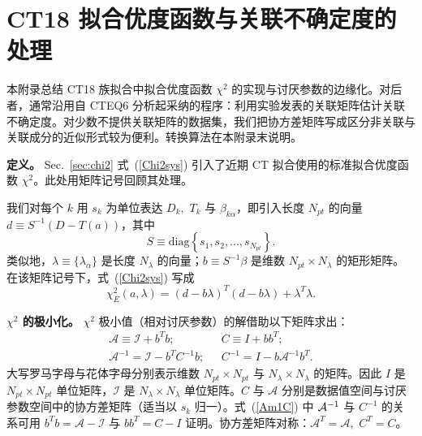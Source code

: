 \clearpage

\section{CT18 拟合优度函数与关联不确定度的处理}
\label{sec:chi2_app}
%
%
\newcommand{\betamat}{b}

本附录总结 CT18 族拟合中拟合优度函数 $\chi^2$ 的实现与讨厌参数的边缘化。对后者，通常沿用自 CTEQ6 分析起采纳的程序：利用实验发表的关联矩阵估计关联不确定度。对少数不提供关联矩阵的数据集，我们把协方差矩阵写成区分非关联与关联成分的近似形式较为便利。转换算法在本附录末说明。


{\bf 定义。}
Sec.~\ref{sec:chi2} 式~(\ref{Chi2sys}) 引入了近期 CT 拟合使用的标准拟合优度函数 $\chi^{2}$。此处用矩阵记号回顾其处理。

我们对每个 $k$ 用 $s_{k}$ 为单位表达 $D_{k},$ $T_{k}$ 与 $\beta_{k\alpha}$，即引入长度 $N_{pt}$ 的向量
$d\equiv S^{-1}\left(D-T(a)\right)$，其中
\begin{equation}
S\equiv\mbox{diag}\left\{ s_{1},s_{2},...,s_{N_{pt}}\right\} .\label{S}
\end{equation}
类似地，$\lambda\equiv\{\lambda_{\alpha}\}$ 是长度
$N_{\lambda}$ 的向量；$\betamat\equiv S^{-1}\beta$ 是维数 $N_{pt}\times N_{\lambda}$ 的矩形矩阵。在该矩阵记号下，式~(\ref{Chi2sys}) 写成
\begin{equation}
\chi_{E}^{2}(a,\lambda)=\left(d-\betamat\lambda\right)^{T}(d-
\betamat\lambda)+\lambda^{T}\lambda.\label{Chi2sys2}
\end{equation}

{\bf $\chi^{2}$ 的极小化。}
$\chi^{2}$ 极小值（相对讨厌参数）的解借助以下矩阵求出：
\begin{align}
\mathcal{A}\equiv\mathcal{I}+ {\betamat}^{T}\betamat;~~~ & C\equiv I+\betamat\betamat^{T};\label{ACm1}\\
\mathcal{A}^{-1}=\mathcal{I}-\betamat^{T}C^{-1}\betamat;~~~ & C^{-1}=I-\betamat\mathcal{A}^{-1}\betamat^{T}.\label{Am1C}
\end{align}
大写罗马字母与花体字母分别表示维数 $N_{pt}\times N_{pt}$
与 $N_{\lambda}\times N_{\lambda}$ 的矩阵。因此 $I$
是 $N_{pt}\times N_{pt}$ 单位矩阵，$\mathcal{I}$ 是
$N_{\lambda}\times N_{\lambda}$ 单位矩阵。$C$ 与 $\mathcal{A}$
分别是数据值空间与讨厌参数空间中的协方差矩阵（适当以 $s_{k}$ 归一）。式~(\ref{Am1C}) 中 ${\cal A}^{-1}$ 与 $C^{-1}$ 的关系可用 $\betamat^{T}\betamat=\mathcal{A}-\mathcal{I}$ 与
$\betamat\betamat^{T}=C-I$ 证明。协方差矩阵对称：$\mathcal{A}^{T}=\mathcal{A},$
$C^{T}=C$。

